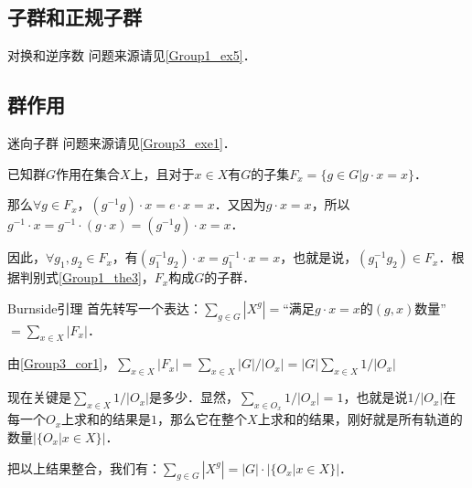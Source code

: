 
\subsection{子群和正规子群}

\begin{example}{对换和逆序数}\label{GroupP_ex1}
问题来源请见\autoref{Group1_ex5}．



\end{example}

\subsection{群作用}

\begin{example}{迷向子群}\label{GroupP_ex2}
问题来源请见\autoref{Group3_exe1}．

已知群$G$作用在集合$X$上，且对于$x\in X$有$G$的子集$F_x=\{g\in G|g\cdot x=x\}$．

那么$\forall g\in F_x$，$(g^{-1}g)\cdot x=e\cdot x=x$．又因为$g\cdot x=x$，所以$g^{-1}\cdot x=g^{-1}\cdot(g\cdot x)=(g^{-1}g)\cdot x=x$．

因此，$\forall g_1, g_2\in F_x$，有$(g_1^{-1}g_2)\cdot x=g_1^{-1}\cdot x=x$，也就是说，$(g_1^{-1}g_2)\in F_x$．根据判别式\autoref{Group1_the3}，$F_x$构成$G$的子群．




\end{example}

\begin{example}{Burnside引理}\label{GroupP_ex3}
首先转写一个表达：$\sum_{g\in G}|X^g|=$“满足$g\cdot x=x$的$(g, x)$数量”$=\sum_{x\in X}|F_x|$．

由\autoref{Group3_cor1}，$\sum_{x\in X}|F_x|=\sum_{x\in X} |G|/|O_x|=|G| \sum_{x\in X} 1/|O_x|$

现在关键是$\sum_{x\in X} 1/|O_x|$是多少．显然，$\sum_{x\in O_x} 1/|O_x|=1$，也就是说$1/|O_x|$在每一个$O_x$上求和的结果是$1$，那么它在整个$X$上求和的结果，刚好就是所有轨道的数量$|\{O_x|x\in X\}|$．

把以上结果整合，我们有：$\sum_{g\in G}|X^g|=|G|\cdot|\{O_x|x\in X\}|$．
\end{example}